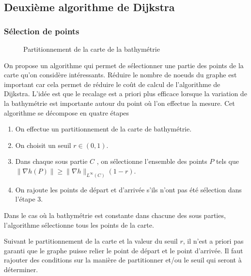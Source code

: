 \subsection{Deuxième algorithme de Dijkstra}
\subsubsection{Sélection de points}
\begin{figure}[hbtp]
\begin{center}
\end{center}
\caption{Partitionnement de la carte de la bathymétrie}
\end{figure}

On propose un algorithme qui permet de sélectionner une partie des points de la carte qu'on considère intéressants. Réduire le nombre de noeuds du graphe est important car cela permet de réduire le coût de calcul de l'algorithme de Dijkstra. L'idée est que le recalage est a priori plus efficace lorsque la variation de la bathymétrie est importante autour du point où l'on effectue la mesure. Cet algorithme se décompose en quatre étapes
\begin{enumerate}
\item On effectue un partitionnement de la carte de bathymétrie.
\item On choisit un seuil $r\in (0,1)$.
\item Dans chaque sous partie $C$ , on sélectionne l'ensemble des points $P$ tels que $\|\nabla h(P)\|\geq \|\nabla h\|_{\mathit{L}^\infty(C)}(1-r)$.
\item On rajoute les points de départ et d'arrivée s'ils n'ont pas été sélection dans l'étape 3.
\end{enumerate} 
\begin{remarque}
Dans le cas où la bathymétrie est constante dans chacune des sous parties, l'algorithme sélectionne tous les points de la carte.
\end{remarque}
\begin{remarque}
Suivant le partitionnement de la carte et la valeur du seuil $r$, il n'est a priori pas garanti que le graphe puisse relier le point de départ et le point d'arrivée. Il faut rajouter des conditions sur la manière de partitionner et/ou le seuil qui seront à déterminer.
\end{remarque}

